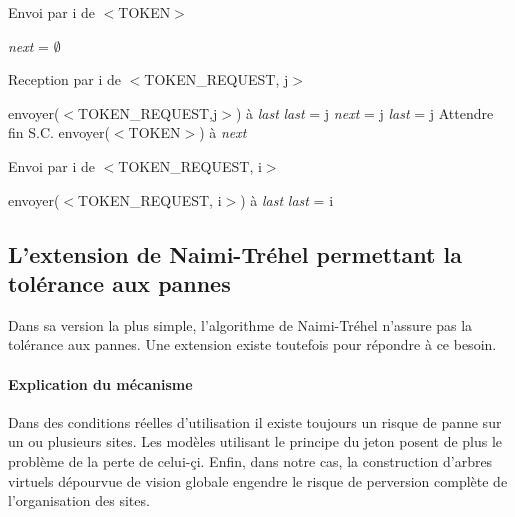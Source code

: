 \documentclass[a4paper,12pt]{article}
\newcommand{\nt}{Naimi-Tréhel }
\newcommand{\last}{\textit{last} }
\newcommand{\next}{\textit{next} }
\begin{document}
\begin{algorithm}[t]
\caption{Envoi par i de $<$TOKEN$>$}
\label{algo_naimi_trehel_envoi_token}
\begin{algorithmic}[1]
\STATE \next = $\emptyset$
\end{algorithmic}
\end{algorithm}

\begin{algorithm}[t]
\caption{Reception par i de $<$TOKEN\_REQUEST, j$>$}
\label{algo_naimi_trehel}
\begin{algorithmic}[1]

\IF {\last$_{i}$ $\ne$ i}
\STATE envoyer($<$TOKEN\_REQUEST,j$>$) à \last 
\STATE \last = j
\ELSE
\STATE \next = j
\STATE \last = j
\STATE Attendre fin S.C.
\STATE envoyer($<$TOKEN$>$) à \next
\ENDIF
\end{algorithmic}
\end{algorithm}

\begin{algorithm}[t]
\caption{Envoi par i de $<$TOKEN\_REQUEST, i$>$}
\label{algo_naimi_trehel_envoi_TK}
\begin{algorithmic}[1]
\STATE envoyer($<$TOKEN\_REQUEST, i$>$) à \last
\STATE \last = i
\end{algorithmic}
\end{algorithm}



%

\subsection{L'extension de \nt permettant la tolérance aux pannes}

Dans sa version la plus simple, l'algorithme de \nt n'assure pas la tolérance aux pannes. Une extension existe toutefois pour répondre à ce besoin.

\paragraph{Explication du mécanisme}

Dans des conditions réelles d'utilisation il existe toujours un risque de panne sur un ou plusieurs sites. Les modèles utilisant le principe du jeton posent de plus le problème de la perte de celui-çi. Enfin, dans notre cas, la construction d'arbres virtuels dépourvue de vision globale engendre le risque de perversion complète de l'organisation des sites.
\end{document}
